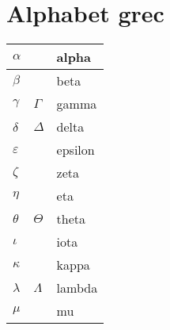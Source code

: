 \documentclass[10pt,class=article,crop=false]{standalone}
\begin{document}
\section{Alphabet grec}


\begin{multicols}{2}

	\large
\begin{center}
	\setlength{\arrayrulewidth}{0.05mm}
	\begin{tabular}[t]{|ll|l@{\vrule depth 1.2ex height 3ex width 0mm \ }|}
		\hline
		$\alpha$      &               & alpha   \\ \hline
		$\beta$       &               & beta    \\ \hline
		$\gamma$      & $\Gamma$      & gamma   \\ \hline
		$\delta$      & $\Delta$      & delta   \\ \hline
		$\varepsilon$ &               & epsilon \\ \hline
		$\zeta$       &               & zeta    \\ \hline
		$\eta$        &               & eta     \\ \hline
		$\theta$      & $\Theta$      & theta   \\ \hline
		$\iota$       &               & iota    \\ \hline
		$\kappa$      &               & kappa   \\ \hline
		$\lambda$     & $\Lambda$     & lambda  \\ \hline
		$\mu$         &               & mu      \\ \hline
	\end{tabular}
\end{center}


\end{multicols}
\end{document}

